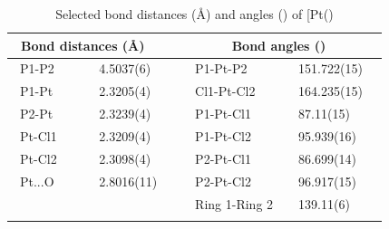 \begin{table}[ht]
\caption[Selected bond distances (\AA) and angles (\degrees) of [Pt(\tButhixantphos)\ce{Cl2]}]{Selected bond distances (\AA) and angles (\degrees) of [Pt(\tButhixantphos)\ce{Cl2]}}
\vspace{1em}
\label{table:crystalthixantphosplatinumdichloride:lengths}
\small
\begin{center}
\begin{tabular}{l l l l}
	\toprule
	\multicolumn{2}{l}{\bfseries{~Bond distances (\si{\angstrom})}} & \multicolumn{2}{c}{\bfseries{Bond angles (\degrees)}} \\
	\midrule		
	~P1-P2		~~&~~4.5037(6)~~	&~~P1-Pt-P2			&~~151.722(15)~~	\\	
	~P1-Pt		~~&~~2.3205(4)~~	&~~Cl1-Pt-Cl2			&~~164.235(15)~~	\\
	~P2-Pt		~~&~~2.3239(4)~~	&~~P1-Pt-Cl1			&~~87.11(15)~~	\\
	~Pt-Cl1		~~&~~2.3209(4)~~	&~~P1-Pt-Cl2			&~~95.939(16)~~	\\
	~Pt-Cl2		~~&~~2.3098(4)~~	&~~P2-Pt-Cl1			&~~86.699(14)~~	\\
	~Pt...O		~~&~~2.8016(11)~~	&~~P2-Pt-Cl2			&~~96.917(15)~~	\\
	~				&			&~~Ring 1-Ring 2		&~~139.11(6)~~	\\
	\bottomrule{}
\end{tabular}
\end{center}
\end{table}

